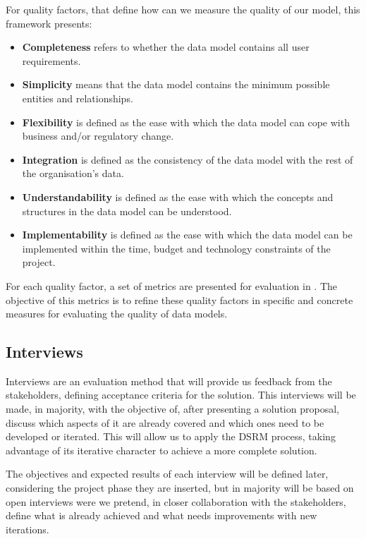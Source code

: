 For quality factors, that define how can we measure the quality of our model, this framework presents:

\begin{itemize}
\item \textbf{Completeness} refers to whether the data model contains all user requirements.
\item \textbf{Simplicity} means that the data model contains the minimum possible entities and relationships.
\item \textbf{Flexibility} is defined as the ease with which the data model can cope with business and/or regulatory change.
\item \textbf{Integration} is defined as the consistency of the data model with the rest of the organisation's data.
\item \textbf{Understandability} is defined as the ease with which the concepts and structures in the data model can be understood.
\item \textbf{Implementability} is defined as the ease with which the data model can be implemented within the time, budget and technology constraints of the project.
\end{itemize}

For each quality factor, a set of metrics are presented for evaluation in \cite{moody1998metrics}. The objective of this metrics is to refine these quality factors in specific and concrete measures for evaluating the quality of data models. 

\subsection{Interviews}

Interviews are an evaluation method that will provide us feedback from the stakeholders, defining acceptance criteria for the solution. This interviews will be made, in majority, with the objective of, after presenting a solution proposal, discuss which aspects of it are already covered and which ones need to be developed or iterated. This will allow us to apply the DSRM process, taking advantage of its iterative character to achieve a more complete solution.\par
The objectives and expected results of each interview will be defined later, considering the project phase they are inserted, but in majority will be based on open interviews were we pretend, in closer collaboration with the stakeholders, define what is already achieved and what needs improvements with new iterations.\par  

